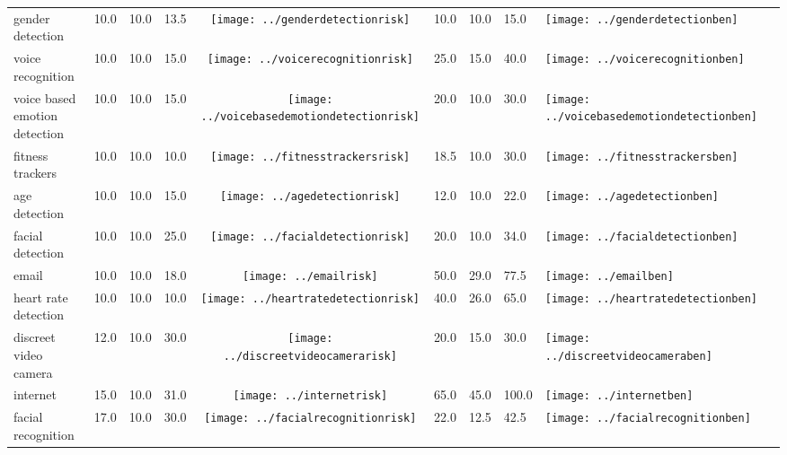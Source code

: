 \begin{table}[t]
\begin{center}
\begin{tabular}{| p{2cm} | p{1cm} | p{1cm} | p{1cm} | c | p{2cm} | p{1cm} | p{1cm} | p{1cm} | c |}
gender detection & 10.0 & 10.0 & 13.5 & \texttt{[image: ../genderdetectionrisk]} & 10.0 & 10.0 & 15.0 & \texttt{[image: ../genderdetectionben]} \\ 
voice recognition & 10.0 & 10.0 & 15.0 & \texttt{[image: ../voicerecognitionrisk]} & 25.0 & 15.0 & 40.0 & \texttt{[image: ../voicerecognitionben]} \\ 
voice based emotion detection & 10.0 & 10.0 & 15.0 & \texttt{[image: ../voicebasedemotiondetectionrisk]} & 20.0 & 10.0 & 30.0 & \texttt{[image: ../voicebasedemotiondetectionben]} \\ 
fitness trackers & 10.0 & 10.0 & 10.0 & \texttt{[image: ../fitnesstrackersrisk]} & 18.5 & 10.0 & 30.0 & \texttt{[image: ../fitnesstrackersben]} \\ 
age detection & 10.0 & 10.0 & 15.0 & \texttt{[image: ../agedetectionrisk]} & 12.0 & 10.0 & 22.0 & \texttt{[image: ../agedetectionben]} \\ 
facial detection & 10.0 & 10.0 & 25.0 & \texttt{[image: ../facialdetectionrisk]} & 20.0 & 10.0 & 34.0 & \texttt{[image: ../facialdetectionben]} \\ 
email & 10.0 & 10.0 & 18.0 & \texttt{[image: ../emailrisk]} & 50.0 & 29.0 & 77.5 & \texttt{[image: ../emailben]} \\ 
heart rate detection & 10.0 & 10.0 & 10.0 & \texttt{[image: ../heartratedetectionrisk]} & 40.0 & 26.0 & 65.0 & \texttt{[image: ../heartratedetectionben]} \\ 
discreet video camera & 12.0 & 10.0 & 30.0 & \texttt{[image: ../discreetvideocamerarisk]} & 20.0 & 15.0 & 30.0 & \texttt{[image: ../discreetvideocameraben]} \\ 
internet & 15.0 & 10.0 & 31.0 & \texttt{[image: ../internetrisk]} & 65.0 & 45.0 & 100.0 & \texttt{[image: ../internetben]} \\ 
facial recognition & 17.0 & 10.0 & 30.0 & \texttt{[image: ../facialrecognitionrisk]} & 22.0 & 12.5 & 42.5 & \texttt{[image: ../facialrecognitionben]} \\ 


\end{tabular}
\end{center}
\end{table}
